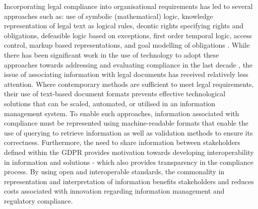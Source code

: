 Incorporating legal compliance into organisational requirements has led to several approaches such as: use of symbolic (mathematical) logic, knowledge representation of legal text as logical rules, deontic rights specifying rights and obligations, defeasible logic based on exceptions, first order temporal logic, access control, markup based representations, and goal modelling of obligations \cite{otto_addressing_2007}.
While there has been significant work in the use of technology to adopt these approaches towards addressing and evaluating compliance in the last decade \cite{sadiq_modeling_2007,otto_addressing_2007,gordon_rules_2009,fellmann_state---art_2014,benyoucef_information_2015,elgammal_formalizing_2016,kirrane_access_2016}, the issue of associating information with legal documents has received relatively less attention.
Where contemporary methods are sufficient to meet legal requirements, their use of text-based document formats prevents effective technological solutions that can be scaled, automated, or utilised in an information management system. To enable such approaches, information associated with compliance must be represented using machine-readable formats that enable the use of querying to retrieve information as well as validation methods to ensure its correctness. Furthermore, the need to share information between stakeholders defined within the GDPR provides motivation towards developing interoperability in information and solutions - which also provides transparency in the compliance process. By using open and interoperable standards, the commonality in representation and interpretation of information benefits stakeholders and reduces costs associated with innovation regarding information management and regulatory compliance.

